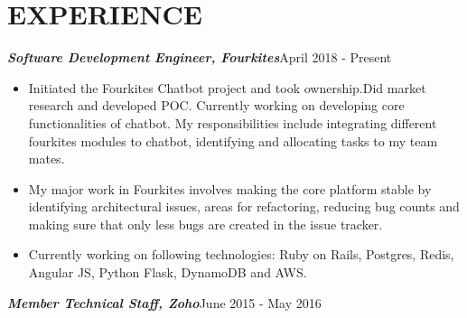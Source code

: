 \documentclass[11pt,a4paper]{article}
\begin{document}
\section*{EXPERIENCE}
\emph{\textbf {Software Development Engineer, Fourkites}}{\hfill April 2018 - Present}
\begin{itemize}[noitemsep]
\item  Initiated the Fourkites Chatbot project and took ownership.Did market research and developed POC. Currently working on developing core functionalities of chatbot. My responsibilities include integrating different fourkites modules to chatbot, identifying and allocating tasks to my team mates.
\item My major work in Fourkites involves making the core platform stable by identifying architectural issues, areas for refactoring, reducing bug counts and making sure that only less bugs are created in the issue tracker.
\item Currently working on following technologies: Ruby on Rails, Postgres, Redis, Angular JS, Python Flask, DynamoDB and AWS. 
\end{itemize}
\emph{\textbf {Member Technical Staff, Zoho}}{\hfill June 2015 - May 2016}
\end{document}
